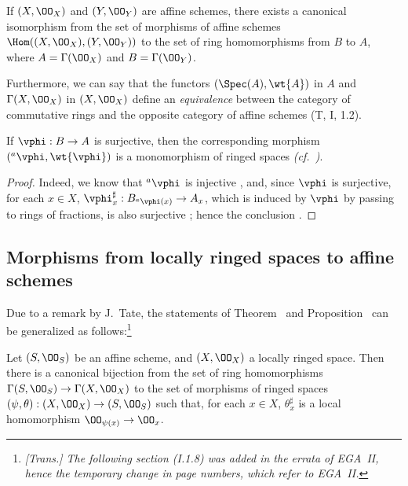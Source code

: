 \begin{cor}[1.7.4]
\label{1.1.7.4}
If $(X,\OO_X)$ and $(Y,\OO_Y)$ are affine schemes, there exists a canonical isomorphism from the set of morphisms of affine schemes $\Hom((X,\OO_X),(Y,\OO_Y))$ to the set of ring homomorphisms from $B$ to $A$, where $A=\Gamma(\OO_X)$ and $B=\Gamma(\OO_Y)$.
\end{cor}

Furthermore, we can say that the functors $(\Spec(A),\wt{A})$ in $A$ and $\Gamma(X,\OO_X)$ in $(X,\OO_X)$ define an \emph{equivalence} between the category of commutative rings and the opposite category of affine schemes (T, I, 1.2).

\begin{cor}[1.7.5]
\label{1.1.7.5}
If $\vphi:B\to A$ is surjective, then the corresponding morphism $({}^a\vphi,\wt{\vphi})$ is a monomorphism of ringed spaces \emph{(cf.~)}.
\end{cor}

\begin{proof}
\label{proof-1.1.7.5}
Indeed, we know that ${}^a\vphi$ is injective , and, since $\vphi$ is
surjective, for each $x\in X$, $\vphi_x^\sharp:B_{{}^a\vphi(x)}\to A_x$, which is induced by $\vphi$ by passing to rings of fractions, is also surjective ;
hence the conclusion .
\end{proof}

\subsection{Morphisms from locally ringed spaces to affine schemes}
\label{subsection:morphisms-lrs-to-affine-schemes}

Due to a remark by J.~Tate, the statements of Theorem~ and Proposition~ can be generalized as follows:\footnote{\emph{[Trans.] The following section (I.1.8) was added in the errata of EGA~II, hence the temporary change in page numbers, which refer to EGA~II.}}

\begin{prop}[1.8.1]
\label{1.1.8.1}
Let $(S,\OO_S)$ be an affine scheme, and $(X,\OO_X)$ a locally ringed space.
Then there is a canonical bijection from the set of ring homomorphisms
$\Gamma(S,\OO_S)\to\Gamma(X,\OO_X)$ to the set of morphisms of ringed spaces $(\psi,\theta):(X,\OO_X)\to(S,\OO_S)$ such that, for each $x\in X$, $\theta_x^\sharp$ is a local homomorphism $\OO_{\psi(x)}\to\OO_x$.
\end{prop}

